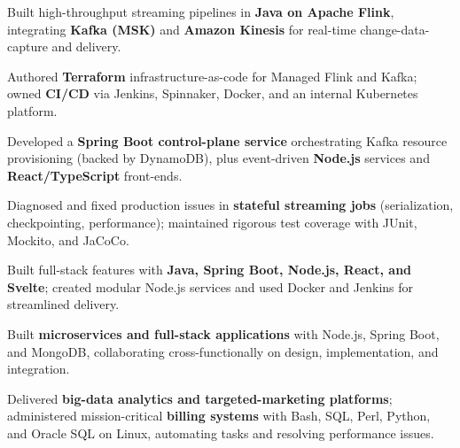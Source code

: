 \documentclass{cv}
\begin{document}
\begin{tight}
  \item Built high-throughput streaming pipelines in \textbf{Java on Apache Flink}, integrating \textbf{Kafka (MSK)} and \textbf{Amazon Kinesis} for real-time change-data-capture and delivery.
  \item Authored \textbf{Terraform} infrastructure-as-code for Managed Flink and Kafka; owned \textbf{CI/CD} via Jenkins, Spinnaker, Docker, and an internal Kubernetes platform.
  \item Developed a \textbf{Spring Boot control-plane service} orchestrating Kafka resource provisioning (backed by DynamoDB), plus event-driven \textbf{Node.js} services and \textbf{React/TypeScript} front-ends.
  \item Diagnosed and fixed production issues in \textbf{stateful streaming jobs} (serialization, checkpointing, performance); maintained rigorous test coverage with JUnit, Mockito, and JaCoCo.
\end{tight}

\begin{tight}
  \item Built full-stack features with \textbf{Java, Spring Boot, Node.js, React, and Svelte}; created modular Node.js services and used Docker and Jenkins for streamlined delivery.
\end{tight}

\begin{tight}
  \item Built \textbf{microservices and full-stack applications} with Node.js, Spring Boot, and MongoDB, collaborating cross-functionally on design, implementation, and integration.
\end{tight}

\begin{tight}
  \item Delivered \textbf{big-data analytics and targeted-marketing platforms}; administered mission-critical \textbf{billing systems} with Bash, SQL, Perl, Python, and Oracle SQL on Linux, automating tasks and resolving performance issues.
\end{tight}

\end{document}
